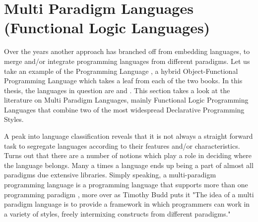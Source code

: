 \documentclass[thesis-solanki.tex]{subfiles}
\begin{document}
\chapter{Multi Paradigm Languages (Functional Logic Languages)}\label{chap:multiparadigm}

Over the years another approach has branched off from embedding languages, to merge and/or integrate programming 
languages from different paradigms. Let us take an example of the  Programming Language \cite{website:scala}, a 
hybrid Object-Functional Programming Language which takes a leaf from each of the two books. In this thesis, the languages in 
question are  and . This section takes a look at the literature on Multi Paradigm Languages, mainly Functional 
Logic Programming Languages that combine two of the most widespread Declarative Programming Styles.      

\par A peak into language classification reveals that it is not always a straight forward task to segregate languages according to their features and/or 
characteristics. Turns out that there are a number of notions which play a role in deciding where the language belongs. Many a times a language ends up 
being a part of almost all paradigms due extensive libraries. Simply speaking, a multi-paradigm programming language is a programming language that 
supports more than one programming paradigm \cite{Krishnamurthi:2008:TPL:1480828.1480846}, more over as Timothy Budd puts it 
\cite{website:wikimultiparadigm} "The idea of a multi paradigm language is to provide a framework in which programmers can work in a variety of styles, 
freely intermixing constructs from different paradigms."       



\begin{comment}
\subparagraph{}
In this section we talk about marrying or integrating the paradigms, multi paradigm programming language approach. Here we talk 
about combining the two most important and widely spread declarative paradigms, Functional and Logical Programming Paradigms. 
\end{comment}  
\end{document}
